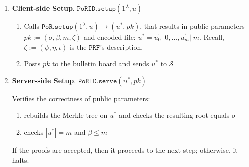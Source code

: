 

\begin{enumerate}
\item\textbf{Client-side Setup}. $\mathtt{PoRID.setup}(1^{\lambda}, u)$
\begin{enumerate}
\item Calls  $\mathtt{PoR.setup}(1^{\lambda}, u)\rightarrow (u^{\scriptscriptstyle *},pk)$, that results in public parameters $pk:=(\sigma,\beta,m,\zeta)$ and encoded file: $u^{\scriptscriptstyle *}=u^{\scriptscriptstyle '}_{\scriptscriptstyle 0}||0,...,u^{\scriptscriptstyle '}_{\scriptscriptstyle m}||m$. Recall,  $\zeta:=(\psi,\eta, \iota)$ is the $\mathtt{PRF}$'s description.

\item Posts $pk$ to the bulletin board and sends $u^{\scriptscriptstyle *}$ to $\mathcal{S}$ 
\end{enumerate}

\item\textbf{Server-side Setup}. $\mathtt{PoRID.serve}(u^{\scriptscriptstyle *},pk)$

Verifies the correctness of public parameters:
\begin{enumerate}
\item rebuilds  the Merkle tree on $u^{\scriptscriptstyle *}$ and checks the resulting root equals $\sigma$
\item checks $|u^{*}|=m$ and  $\beta\leq m$
\end{enumerate}
 If the proofs are accepted, then it proceeds to the next step; otherwise, it halts.
 


\end{enumerate}
